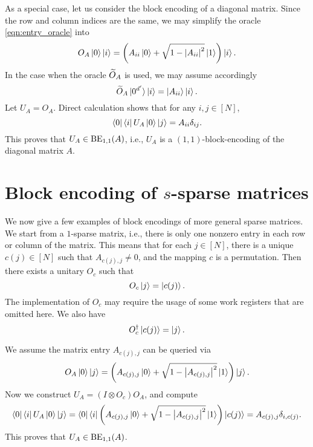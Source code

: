 \begin{exam}
\label{exam:block_encode_diagonal}
As a special case, let us consider the block encoding of a diagonal matrix.
Since the row and column indices are the same, we may simplify the oracle \cref{eqn:entry_oracle} into
\begin{equation}
O_A \ket{0}\ket{i}=\left(A_{ii}\ket{0}+\sqrt{1-\left\lvert A_{ii}\right\rvert^2}\ket{1}\right)\ket{i}.
\end{equation}
In the case when the oracle $\widetilde{O}_A$ is used, we may assume accordingly
\begin{equation}
\widetilde{O}_A \ket{0^{d'}}\ket{i}=\ket{A_{ii}}\ket{i}.
\end{equation}
Let $U_A=O_A$. Direct calculation shows that for any $i,j\in [N]$,
\begin{equation}
\bra{0}\bra{i}U_A\ket{0}\ket{j}=A_{ii}\delta_{ij}.
\end{equation}
This proves that $U_A\in\operatorname{BE}_{1,1}(A)$, i.e., $U_A$ is a $(1,1)$-block-encoding of the diagonal matrix $A$.
\end{exam}

\section{Block encoding of $s$-sparse matrices}

We now give a few examples of block encodings of more general sparse matrices.
We start from a $1$-sparse matrix, i.e., there is only one nonzero entry in each row or column of the matrix. This means that for each $j\in [N]$, there is a unique $c(j)\in[N]$ such that $A_{c(j),j}\ne 0$, and the mapping $c$ is a permutation. Then there exists a unitary $O_c$ such that
\begin{equation}
O_{c}\ket{j}=\ket{c(j)}.
\end{equation}
The implementation of $O_c$ may require the usage of some work registers that are omitted here. We also have
\begin{equation}
O_c^{\dag}\ket{c(j)}=\ket{j}.
\end{equation}

We assume the matrix entry $A_{c(j),j}$ can be queried via
\begin{equation}
O_A \ket{0}\ket{j}=\left(A_{c(j),j}\ket{0}+\sqrt{1-\left\lvert A_{c(j),j}\right\rvert^2}\ket{1}\right)\ket{j}.
\end{equation}
Now we construct $U_A=(I\otimes O_c)O_A$, and compute
\begin{equation}
\bra{0}\bra{i}U_A\ket{0}\ket{j}=\bra{0}\bra{i}\left(A_{c(j),j}\ket{0}+\sqrt{1-\left\lvert A_{c(j),j}\right\rvert^2}\ket{1}\right)\ket{c(j)}
=A_{c(j),j} \delta_{i,c(j)}.
\end{equation}
This proves that $U_A\in\operatorname{BE}_{1,1}(A)$.


